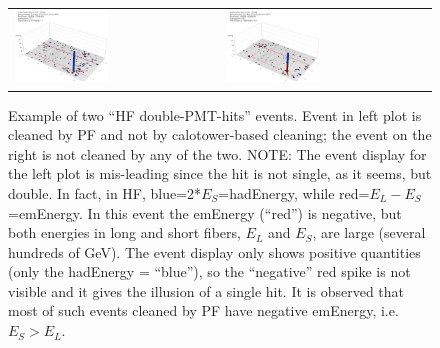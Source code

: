 %
\begin{figure}[h]
 \centering
 \begin{tabular}{ll}
   \includegraphics[width=0.47\textwidth]{fig/HFdoubleHit.eps} &
   \includegraphics[width=0.47\textwidth]{fig/HFdoubleHit_1.eps} \\
 \end{tabular}
\caption{Example of two ``HF double-PMT-hits'' events. Event in left plot is cleaned by PF and not by 
calotower-based cleaning; the event on the right is not cleaned by any of the two. 
NOTE: The event display for the left plot is mis-leading since the hit is not single, 
as it seems, but double. In fact, in HF, blue=2*$E_{S}$=hadEnergy, while red=$E_{L}-E_{S}$=emEnergy. 
In this event the emEnergy (``red'') is negative, but both energies in long and short fibers, $E_{L}$ and $E_{S}$, are large
(several hundreds of GeV). The event display only shows positive quantities 
(only the hadEnergy = ``blue''), so the ``negative'' red spike is not visible and it gives the illusion of a single hit. 
It is observed that most of such events cleaned by PF have negative emEnergy, i.e. $E_S>E_L$.}
\label{fig:HFdoublehits}
\end{figure}

